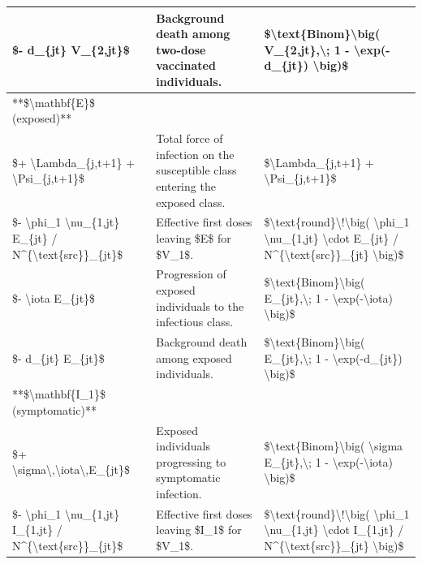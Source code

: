 \documentclass[
]{book}
\begin{document}
\begin{tabular}{l|l|l}
\hline
\$- d\_\{jt\} V\_\{2,jt\}\$ & Background death among two-dose vaccinated individuals. & \$\textbackslash{}text\{Binom\}\textbackslash{}big( V\_\{2,jt\},\textbackslash{}; 1 - \textbackslash{}exp(-d\_\{jt\}) \textbackslash{}big)\$\\
\hline
**\$\textbackslash{}mathbf\{E\}\$ (exposed)** &  & \\
\hline
\$+ \textbackslash{}Lambda\_\{j,t+1\} + \textbackslash{}Psi\_\{j,t+1\}\$ & Total force of infection on the susceptible class entering the exposed class. & \$\textbackslash{}Lambda\_\{j,t+1\} + \textbackslash{}Psi\_\{j,t+1\}\$\\
\hline
\$- \textbackslash{}phi\_1 \textbackslash{}nu\_\{1,jt\} E\_\{jt\} / N\textasciicircum{}\{\textbackslash{}text\{src\}\}\_\{jt\}\$ & Effective first doses leaving \$E\$ for \$V\_1\$. & \$\textbackslash{}text\{round\}\textbackslash{}!\textbackslash{}big( \textbackslash{}phi\_1 \textbackslash{}nu\_\{1,jt\} \textbackslash{}cdot E\_\{jt\} / N\textasciicircum{}\{\textbackslash{}text\{src\}\}\_\{jt\} \textbackslash{}big)\$\\
\hline
\$- \textbackslash{}iota E\_\{jt\}\$ & Progression of exposed individuals to the infectious class. & \$\textbackslash{}text\{Binom\}\textbackslash{}big( E\_\{jt\},\textbackslash{}; 1 - \textbackslash{}exp(-\textbackslash{}iota) \textbackslash{}big)\$\\
\hline
\$- d\_\{jt\} E\_\{jt\}\$ & Background death among exposed individuals. & \$\textbackslash{}text\{Binom\}\textbackslash{}big( E\_\{jt\},\textbackslash{}; 1 - \textbackslash{}exp(-d\_\{jt\}) \textbackslash{}big)\$\\
\hline
**\$\textbackslash{}mathbf\{I\_1\}\$ (symptomatic)** &  & \\
\hline
\$+ \textbackslash{}sigma\textbackslash{},\textbackslash{}iota\textbackslash{},E\_\{jt\}\$ & Exposed individuals progressing to symptomatic infection. & \$\textbackslash{}text\{Binom\}\textbackslash{}big( \textbackslash{}sigma E\_\{jt\},\textbackslash{}; 1 - \textbackslash{}exp(-\textbackslash{}iota) \textbackslash{}big)\$\\
\hline
\$- \textbackslash{}phi\_1 \textbackslash{}nu\_\{1,jt\} I\_\{1,jt\} / N\textasciicircum{}\{\textbackslash{}text\{src\}\}\_\{jt\}\$ & Effective first doses leaving \$I\_1\$ for \$V\_1\$. & \$\textbackslash{}text\{round\}\textbackslash{}!\textbackslash{}big( \textbackslash{}phi\_1 \textbackslash{}nu\_\{1,jt\} \textbackslash{}cdot I\_\{1,jt\} / N\textasciicircum{}\{\textbackslash{}text\{src\}\}\_\{jt\} \textbackslash{}big)\$\\

\end{tabular}
\end{document}
